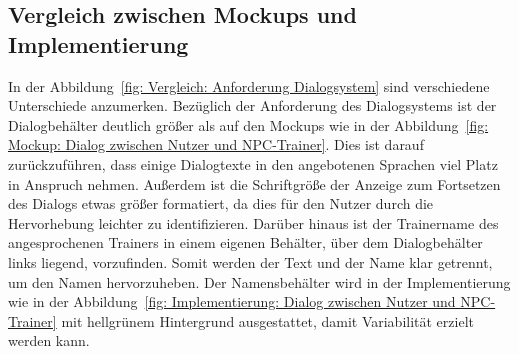 \subsection{Vergleich zwischen Mockups und Implementierung}\label{subsec:vergleich-zwischen-mockups-und-implementierung-dialogsystem}
In der Abbildung~\ref{fig: Vergleich: Anforderung Dialogsystem} sind verschiedene Unterschiede anzumerken. Bezüglich der Anforderung des Dialogsystems ist der Dialogbehälter deutlich größer als auf den Mockups wie in der Abbildung~\ref{fig: Mockup: Dialog zwischen Nutzer und NPC-Trainer}. Dies ist darauf zurückzuführen, dass einige Dialogtexte in den angebotenen Sprachen viel Platz in Anspruch nehmen. Außerdem ist die Schriftgröße der Anzeige zum Fortsetzen des Dialogs etwas größer formatiert, da dies für den Nutzer durch die Hervorhebung leichter zu identifizieren. Darüber hinaus ist der Trainername des angesprochenen Trainers in einem eigenen Behälter, über dem Dialogbehälter links liegend, vorzufinden. Somit werden der Text und der Name klar getrennt, um den Namen hervorzuheben. Der Namensbehälter wird in der Implementierung wie in der Abbildung~\ref{fig: Implementierung: Dialog zwischen Nutzer und NPC-Trainer} mit hellgrünem Hintergrund ausgestattet, damit Variabilität erzielt werden kann.

